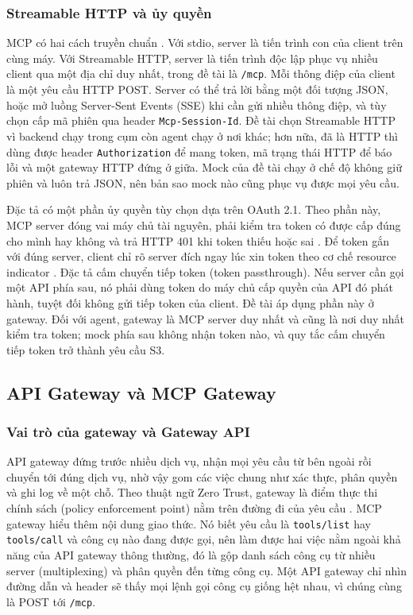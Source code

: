 \documentclass[a4paper]{article}
\begin{document}
\subsubsection{Streamable HTTP và ủy quyền}

MCP có hai cách truyền chuẩn \parencite{mcp_transports}. Với stdio, server là tiến trình con của client trên cùng máy. Với Streamable HTTP, server là tiến trình độc lập phục vụ nhiều client qua một địa chỉ duy nhất, trong đề tài là \texttt{/mcp}. Mỗi thông điệp của client là một yêu cầu HTTP POST. Server có thể trả lời bằng một đối tượng JSON, hoặc mở luồng Server-Sent Events (SSE) khi cần gửi nhiều thông điệp, và tùy chọn cấp mã phiên qua header \texttt{Mcp-Session-Id}. Đề tài chọn Streamable HTTP vì backend chạy trong cụm còn agent chạy ở nơi khác; hơn nữa, đã là HTTP thì dùng được header \texttt{Authorization} để mang token, mã trạng thái HTTP để báo lỗi và một gateway HTTP đứng ở giữa. Mock của đề tài chạy ở chế độ không giữ phiên và luôn trả JSON, nên bản sao mock nào cũng phục vụ được mọi yêu cầu.

Đặc tả có một phần ủy quyền tùy chọn dựa trên OAuth 2.1. Theo phần này, MCP server đóng vai máy chủ tài nguyên, phải kiểm tra token có được cấp đúng cho mình hay không và trả HTTP 401 khi token thiếu hoặc sai \parencite{mcp_authorization}. Để token gắn với đúng server, client chỉ rõ server đích ngay lúc xin token theo cơ chế resource indicator \parencite{rfc8707}. Đặc tả cấm chuyển tiếp token (token passthrough). Nếu server cần gọi một API phía sau, nó phải dùng token do máy chủ cấp quyền của API đó phát hành, tuyệt đối không gửi tiếp token của client. Đề tài áp dụng phần này ở gateway. Đối với agent, gateway là MCP server duy nhất và cũng là nơi duy nhất kiểm tra token; mock phía sau không nhận token nào, và quy tắc cấm chuyển tiếp token trở thành yêu cầu S3.

\subsection{API Gateway và MCP Gateway}

\subsubsection{Vai trò của gateway và Gateway API}

API gateway đứng trước nhiều dịch vụ, nhận mọi yêu cầu từ bên ngoài rồi chuyển tới đúng dịch vụ, nhờ vậy gom các việc chung như xác thực, phân quyền và ghi log về một chỗ. Theo thuật ngữ Zero Trust, gateway là điểm thực thi chính sách (policy enforcement point) nằm trên đường đi của yêu cầu \parencite{nist80207}. MCP gateway hiểu thêm nội dung giao thức. Nó biết yêu cầu là \texttt{tools/list} hay \texttt{tools/call} và công cụ nào đang được gọi, nên làm được hai việc nằm ngoài khả năng của API gateway thông thường, đó là gộp danh sách công cụ từ nhiều server (multiplexing) và phân quyền đến từng công cụ. Một API gateway chỉ nhìn đường dẫn và header sẽ thấy mọi lệnh gọi công cụ giống hệt nhau, vì chúng cùng là POST tới \texttt{/mcp}.
\end{document}

